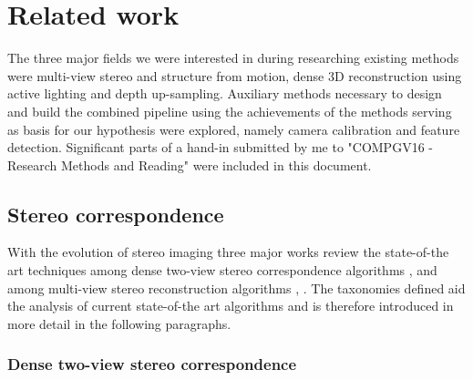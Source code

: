 \documentclass{ucl_thesis}
\begin{document}
\chapter{Related work} 
\label{chp:related_work}

\par The three major fields we were interested in during researching existing methods were multi-view stereo and structure from motion, dense 3D reconstruction using active lighting and depth up-sampling. Auxiliary methods necessary to design and build the combined pipeline using the achievements of the methods serving as basis for our hypothesis were explored, namely camera calibration and feature detection. Significant parts of a hand-in submitted by me to "COMPGV16 - Research Methods and Reading" were included in this document.

\section{Stereo correspondence}
With the evolution of stereo imaging three major works review the state-of-the art techniques among dense two-view stereo correspondence algorithms \cite{ScharsteinS02}, and among multi-view stereo reconstruction algorithms \cite{Seitz:2006}, \cite{Strecha:2008}. The taxonomies defined aid the analysis of current state-of-the art algorithms and is therefore introduced in more detail in the following paragraphs.

\subsection{Dense two-view stereo correspondence} 
\label{subsub:densestereo}
\end{document}
